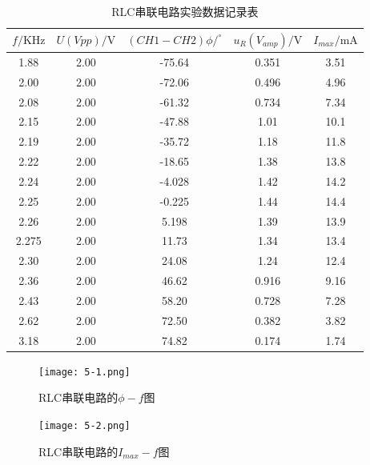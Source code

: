 \documentclass[12pt]{article}
\begin{document}
\begin{table}[htbp]
    \centering
    \begin{tabular}{|c|c|c|c|c|}
    \hline
    $f/\mathrm{KHz}$ & $U(Vpp)/\mathrm{V}$ & $(CH1-CH2)\phi/^{\circ}$ & $u_R(V_{amp})/\mathrm{V}$ & $I_{max}/\mathrm{mA}$ \\
    \hline
    1.88  & 2.00  & -75.64  & 0.351  & 3.51  \\
    \hline
    2.00  & 2.00  & -72.06  & 0.496  & 4.96  \\
    \hline
    2.08  & 2.00  & -61.32  & 0.734  & 7.34  \\
    \hline
    2.15  & 2.00  & -47.88  & 1.01  & 10.1  \\
    \hline
    2.19  & 2.00  & -35.72  & 1.18  & 11.8  \\
    \hline
    2.22  & 2.00  & -18.65  & 1.38  & 13.8  \\
    \hline
    2.24  & 2.00  & -4.028  & 1.42  & 14.2  \\
    \hline
    2.25  & 2.00  & -0.225  & 1.44  & 14.4  \\
    \hline
    2.26  & 2.00  & 5.198  & 1.39  & 13.9  \\
    \hline
    2.275  & 2.00  & 11.73  & 1.34  & 13.4  \\
    \hline
    2.30  & 2.00  & 24.08  & 1.24  & 12.4  \\
    \hline
    2.36  & 2.00  & 46.62  & 0.916  & 9.16  \\
    \hline
    2.43  & 2.00  & 58.20  & 0.728  & 7.28  \\
    \hline
    2.62  & 2.00  & 72.50  & 0.382  & 3.82  \\
    \hline
    3.18  & 2.00  & 74.82  & 0.174  & 1.74  \\
    \hline
    \end{tabular}
    \caption{RLC串联电路实验数据记录表}
\end{table}%

\begin{figure}[htbp]
    \begin{minipage}[t]{0.5\linewidth}
        \centering
        \texttt{[image: 5-1.png]}
        \caption{RLC串联电路的$\phi-f$图}
    \end{minipage}
    \begin{minipage}[t]{0.5\linewidth}
        \centering
        \texttt{[image: 5-2.png]}
        \caption{RLC串联电路的$I_{max}-f$图}
    \end{minipage}
\end{figure}
\end{document}

